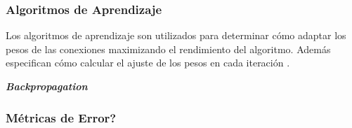 %
\subsubsection{Algoritmos de Aprendizaje}

Los algoritmos de aprendizaje son utilizados para determinar cómo adaptar los pesos de las conexiones maximizando el rendimiento del algoritmo. Además especifican cómo calcular el ajuste de los pesos en cada iteración \cite{Fu}.

\textbf{\emph{Backpropagation}}


\subsubsection{Métricas de Error?}




